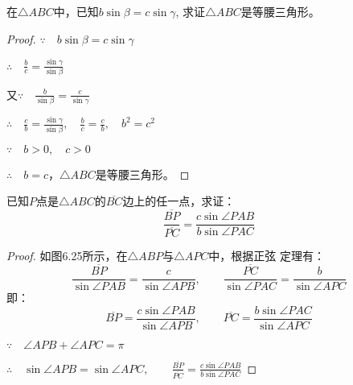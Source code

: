 \begin{example}
    在$\triangle ABC$中，已知$b\sin\beta=c\sin\gamma$, 求证$\triangle ABC$是等腰三角形。
\end{example}   

\begin{proof}
$\because\quad b\sin\beta=c\sin\gamma$

$\therefore\quad \frac{b}{c}=\frac{\sin\gamma}{\sin\beta}$

又$\because\quad \frac{b}{\sin\beta}=\frac{c}{\sin\gamma}$

$\therefore\quad \frac{c}{b}=\frac{\sin\gamma}{\sin\beta},\quad \frac{b}{c}=\frac{c}{b},\quad b^2=c^2$

$\because\quad b>0,\quad c>0$

$\therefore\quad b=c$，$\triangle ABC$是等腰三角形。
\end{proof}

\begin{example}
    已知$P$点是$\triangle ABC$的$\overline{BC}$边上的任一点，求证：
\[\frac{\overline{BP}}{\overline{PC}}=\frac{c\sin \angle PAB}{b\sin\angle PAC}\]
\end{example}

\begin{proof}
    如图6.25所示，在$\triangle ABP$与$\triangle APC$中，根据正弦
    定理有：
\[\frac{\overline{BP}}{\sin \angle PAB}=\frac{c}{\sin \angle APB},\qquad \frac{\overline{PC}}{\sin \angle PAC}=\frac{b}{\sin\angle APC}\]
即：    
\[\overline{BP}=\frac{c\sin \angle PAB}{\sin \angle APB},\qquad \overline{PC}=\frac{b\sin \angle PAC}{\sin \angle APC}\]

$\because\quad \angle APB+\angle APC=\pi$    

$\therefore\quad \sin \angle APB=\sin\angle APC,\qquad \frac{\overline{BP}}{\overline{PC}}=\frac{c\sin\angle PAB}{b\sin\angle PAC}$
\end{proof}

\begin{figure}[htp]
    \centering
{}
    \caption{}
\end{figure}

